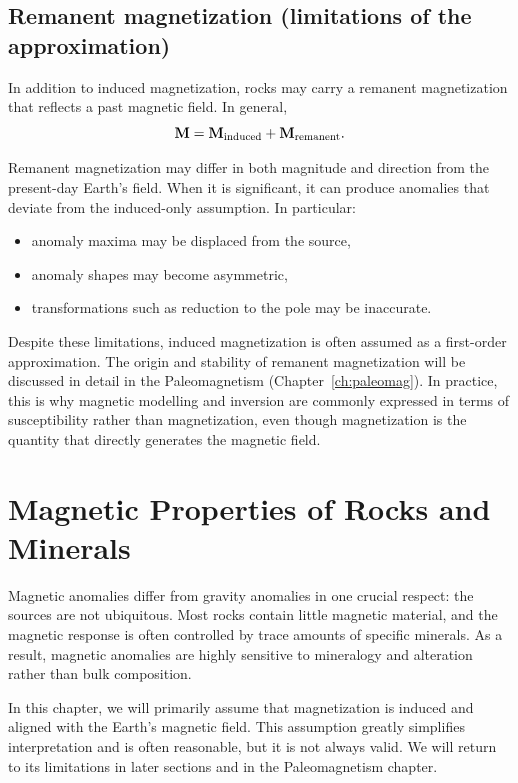 \subsection{Remanent magnetization (limitations of the approximation)}

In addition to induced magnetization, rocks may carry a remanent magnetization that reflects a past magnetic field. In general,
\begin{equation}
    \vb{M} = \vb{M}_{\mathrm{induced}} + \vb{M}_{\mathrm{remanent}}.
\end{equation}

Remanent magnetization may differ in both magnitude and direction from the present-day Earth's field. When it is significant, it can produce anomalies that deviate from the induced-only assumption.  In particular:
\begin{itemize}
    \item anomaly maxima may be displaced from the source,
    \item anomaly shapes may become asymmetric,
    \item transformations such as reduction to the pole may be inaccurate.
\end{itemize}

Despite these limitations, induced magnetization is often assumed as a first-order approximation. The origin and stability of remanent magnetization will be discussed in detail in the Paleomagnetism (Chapter~\ref{ch:paleomag}).  In practice, this is why magnetic modelling and inversion are commonly expressed in terms of susceptibility rather than magnetization, even though magnetization is the quantity that directly generates the magnetic field.


\section{Magnetic Properties of Rocks and Minerals}

Magnetic anomalies differ from gravity anomalies in one crucial respect: the sources are not ubiquitous. Most rocks contain little magnetic material, and the magnetic response is often controlled by trace amounts of specific minerals. As a result, magnetic anomalies are highly sensitive to mineralogy and alteration rather than bulk composition.

In this chapter, we will primarily assume that magnetization is induced and aligned with the Earth's magnetic field. This assumption greatly simplifies interpretation and is often reasonable, but it is not always valid. We will return to its limitations in later sections and in the Paleomagnetism chapter.

